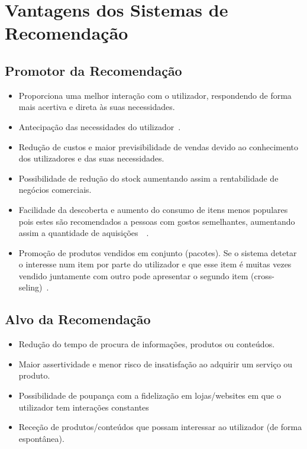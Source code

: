 
\section{Vantagens dos Sistemas de Recomendação}
\subsection{Promotor da Recomendação}
\begin{itemize}
\item Proporciona uma melhor interação com o utilizador, respondendo de forma mais acertiva e direta às suas necessidades.
\item Antecipação das necessidades do utilizador~\cite{ref_book2}.
\item Redução de custos e maior previsibilidade de vendas devido ao conhecimento dos utilizadores e das suas necessidades.
\item Possibilidade de redução do stock aumentando assim a rentabilidade de negócios comerciais.
\item Facilidade da descoberta e aumento do consumo de itens menos populares pois estes são recomendados a pessoas com gostos semelhantes, aumentando assim a quantidade de aquisições~\cite{ref_book2}~\cite{ref_article1}.
\item Promoção de produtos vendidos em conjunto (pacotes). Se o sistema detetar o interesse num item por parte do utilizador e que esse item é muitas vezes vendido juntamente com outro pode apresentar o segundo item (cross-seling)~\cite{ref_book2}.
\end{itemize}


\subsection{Alvo da Recomendação}
\begin{itemize}
\item Redução do tempo de procura de informações, produtos ou conteúdos.
\item Maior assertividade e menor risco de insatisfação ao adquirir um serviço ou produto.
\item Possibilidade de poupança com a fidelização em lojas/websites em que o utilizador tem interações constantes
\item Receção de produtos/conteúdos que possam interessar ao utilizador (de forma espontânea).
\end{itemize}

